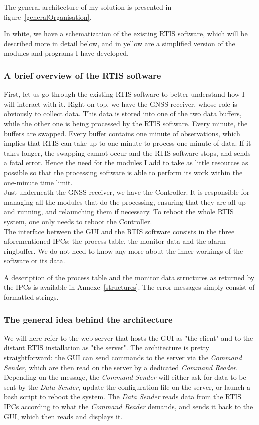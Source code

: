 \documentclass{themeensg}
\begin{document}
The general architecture of my solution is presented in figure~\ref{generalOrganisation}.

In white, we have a schematization of the existing RTIS software, which will be described more in detail below, and in yellow are a simplified version of the modules and programs I have developed.

\subsubsection{A brief overview of the RTIS software}

First, let us go through the existing RTIS software to better understand how I will interact with it. Right on top, we have the GNSS receiver, whose role is obviously to collect data. This data is stored into one of the two data buffers, while the other one is being processed by the RTIS software. Every minute, the buffers are swapped. Every buffer contains one minute of observations, which implies that RTIS can take up to one minute to process one minute of data. If it takes longer, the swapping cannot occur and the RTIS software stops, and sends a fatal error. Hence the need for the modules I add to take as little resources as possible so that the processing software is able to perform its work within the one-minute time limit.\\

Just underneath the GNSS receiver, we have the Controller. It is responsible for managing all the modules that do the processing, ensuring that they are all up and running, and relaunching them if necessary. To reboot the whole RTIS system, one only needs to reboot the Controller.\\

The interface between the GUI and the RTIS software consists in the three aforementioned IPCs: the process table, the monitor data and the alarm ringbuffer. We do not need to know any more about the inner workings of the software or its data.

A description of the process table and the monitor data structures as returned by the IPCs is available in Annexe~\ref{structures}. The error messages simply consist of formatted strings.

\subsubsection{The general idea behind the architecture}

We will here refer to the web server that hosts the GUI as "the client" and to the distant RTIS installation as "the server".
The architecture is pretty straightforward: the GUI can send commands to the server via the \textit{Command Sender}, which are then read on the server by a dedicated \textit{Command Reader}. Depending on the message, the \textit{Command Sender} will either ask for data to be sent by the \textit{Data Sender}, update the configuration file on the server, or launch a bash script to reboot the system. The \textit{Data Sender} reads data from the RTIS IPCs according to what the \textit{Command Reader} demands, and sends it back to the GUI, which then reads and displays it.\\
\end{document}
